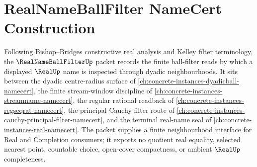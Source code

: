 \chapter{RealNameBallFilter NameCert Construction}
\label{ch:concrete-instances-real-name-ball-filter-namecert}

Following Bishop--Bridges constructive real analysis and Kelley filter terminology, the $\RealNameBallFilterUp$ packet records the finite ball-filter reads by which a displayed $\RealUp$ name is inspected through dyadic neighbourhoods. It sits between the dyadic centre-radius surface of \autoref{ch:concrete-instances-dyadicball-namecert}, the finite stream-window discipline of \autoref{ch:concrete-instances-streamname-namecert}, the regular rational readback of \autoref{ch:concrete-instances-regseqrat-namecert}, the principal Cauchy filter route of \autoref{ch:concrete-instances-cauchy-principal-filter-namecert}, and the terminal real-name seal of \autoref{ch:concrete-instances-real-namecert}. The packet supplies a finite neighbourhood interface for Real and Completion consumers; it exports no quotient real equality, selected nearest point, countable choice, open-cover compactness, or ambient $\RealUp$ completeness.


